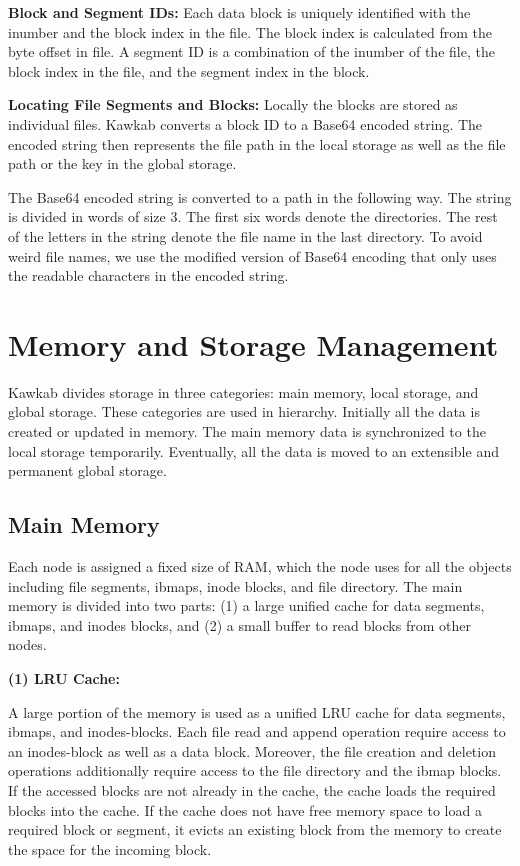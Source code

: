 \documentclass[]{article}
\newcommand{\subtopic}[1]{\vspace{1.5pt} \noindent \textbf{#1}}
\begin{document}

\subtopic{Block and Segment IDs:} Each data block is uniquely identified with
the inumber and the block index in the file.  The block index is calculated
from the byte offset in file.  A segment ID is a combination of the inumber of
the file, the block index in the file, and the segment index in the block.


\subtopic{Locating File Segments and Blocks:} Locally the blocks are stored as
individual files.  Kawkab converts a block ID to a Base64 encoded string. The
encoded string then represents the file path in the local storage as well as
the file path or the key in the global storage.

The Base64 encoded string is converted to a path in the following way.  The
string is divided in words of size 3. The first six words denote the
directories. The rest of the letters in the string denote the file name in the
last directory. To avoid weird file names, we use the modified version of
Base64 encoding that only uses the readable characters in the encoded string.


\section{Memory and Storage Management}

Kawkab divides storage in three categories: main memory, local storage, and global
storage. These categories are used in hierarchy. Initially all the data
is created or updated in memory. The main memory data is synchronized to the
local storage temporarily. Eventually, all the data is moved to an extensible
and permanent global storage.


\subsection{Main Memory}

Each node is assigned a fixed size of RAM, which the node uses 
for all the objects including file segments, ibmaps, inode blocks, and
file directory. The main memory is divided into two parts: (1) a large
unified cache for data segments, ibmaps, and inodes blocks, and (2) a small
buffer to read blocks from other nodes.


\subtopic{(1) LRU Cache:} 

A large portion of the memory is used as a unified LRU cache for data segments,
ibmaps, and inodes-blocks.  Each file read and append operation require access
to an inodes-block as well as a data block. Moreover, the file creation and
deletion operations additionally require access to the file directory and the
ibmap blocks. If the accessed blocks are not already in the cache, the cache
loads the required blocks into the cache.  If the cache does not have free
memory space to load a required block or segment, it evicts an existing block
from the memory to create the space for the incoming block. 
\end{document}
